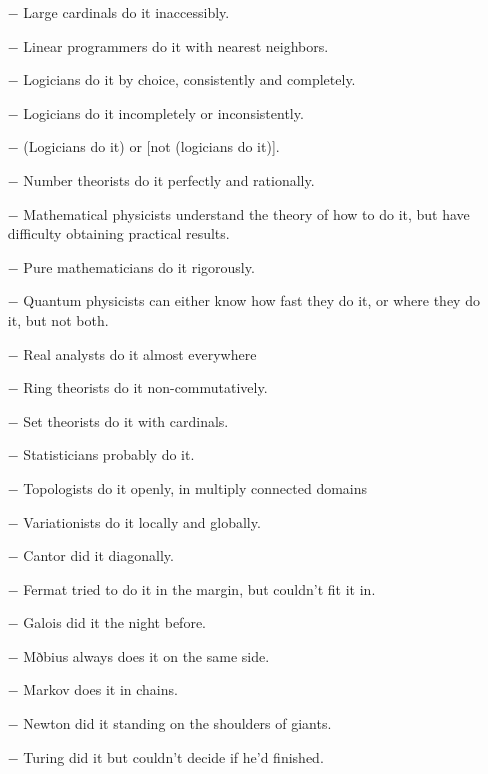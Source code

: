 \begin{itemize}
	\item[$-$] Large cardinals do it inaccessibly.

	\item[$-$] Linear programmers do it with nearest neighbors.

	\item[$-$] Logicians do it by choice, consistently and completely.

	\item[$-$] Logicians do it incompletely or inconsistently.

	\item[$-$] (Logicians do it) or [not (logicians do it)].

	\item[$-$] Number theorists do it perfectly and rationally.

	\item[$-$] Mathematical physicists understand the theory of how to do it, but have difficulty obtaining practical results.

	\item[$-$] Pure mathematicians do it rigorously.

	\item[$-$] Quantum physicists can either know how fast they do it, or where they do it, but not both.

	\item[$-$] Real analysts do it almost everywhere

	\item[$-$] Ring theorists do it non-commutatively.

	\item[$-$] Set theorists do it with cardinals.

	\item[$-$] Statisticians probably do it.

	\item[$-$] Topologists do it openly, in multiply connected domains

	\item[$-$]  Variationists do it locally and globally.

	\item[$-$] Cantor did it diagonally.

	\item[$-$] Fermat tried to do it in the margin, but couldn't fit it in.

	\item[$-$] Galois did it the night before.

	\item[$-$] Mðbius always does it on the same side.

	\item[$-$] Markov does it in chains.

	\item[$-$] Newton did it standing on the shoulders of giants.

	\item[$-$] Turing did it but couldn't decide if he'd finished.
 \end{itemize}
	\begin{center}\underline{\hspace{5 cm}}\end{center}
	 

